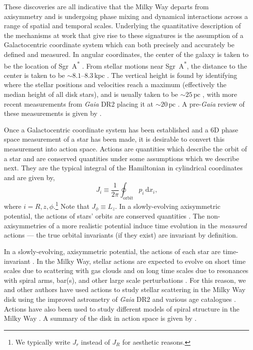 \documentclass[twocolumn]{aastex62}
\newcommand{\pc}{\text{pc}}
\newcommand{\kpc}{\text{kpc}}
\newcommand{\beq}{\begin{equation}}
\newcommand{\eeq}{\end{equation}}
\begin{document}
These discoveries are all indicative that the Milky Way departs from
axisymmetry and is undergoing phase mixing and dynamical interactions across a
range of spatial and temporal scales. Underlying the quantitative description
of the mechanisms at work that give rise to these signatures is the assumption
of a Galactocentric coordinate system \citep{2008gady.book.....B} which can
both precisely and accurately be defined and measured. In angular coordinates,
the center of the galaxy is taken to be the location of
Sgr~A\textsuperscript{*} \citep[e.g.][]{2004ApJ...616..872R}. From stellar
motions near Sgr~A\textsuperscript{*}, the distance to the center is taken to
be $\sim 8.1\text{--}8.3\,\kpc$
\citep{2009ApJ...692.1075G,2018AA...615L..15G}. The vertical height is found
by identifying where the stellar positions and velocities reach a maximum
(effectively the median height of all disk stars), and is usually taken to be
$\sim 25\,\pc$ \citep{2001ApJ...553..184C}, with more recent measurements from
{\em Gaia} DR2 placing it at $\sim 20\,\pc$ \citep{2019MNRAS.482.1417B}. A
pre-{\em Gaia} review of these measurements is given by
\citet{2016ARAA..54..529B}.

Once a Galactocentric coordinate system has been established and a 6D phase
space measurement of a star has been made, it is desirable to convert this
measurement into action space. Actions are quantities which describe the orbit
of a star and are conserved quantities under some assumptions which we
describe next. They are the typical integral of the Hamiltonian in cylindrical
coordinates and are given by,
\beq\label{eq:actions}
J_i \equiv
\frac{1}{2\pi} \oint_{\text{orbit}}p_i\,\text{d}x_i\text{,}
\eeq
where $i=R,z,\phi$.\footnote{We typically write $J_r$ instead of $J_R$ for
aesthetic reasons.} Note that $J_{\phi} \equiv L_z$. In a slowly-evolving
axisymmetric potential, the actions of stars' orbits are conserved quantities
\citep{2008gady.book.....B,2014RvMP...86....1S}. The non-axisymmetries of a
more realistic potential induce time evolution in the {\em measured} actions
--- the true orbital invariants (if they exist) are invariant by definition.

In a slowly-evolving, axisymmetric potential, the actions of each star are
time-invariant \citep{2008gady.book.....B}. In the Milky Way, stellar actions
are expected to evolve on short time scales due to scattering with gas clouds
and on long time scales due to resonances with spiral arms, bar(s), and other
large scale perturbations \citep{2014RvMP...86....1S}. For this reason, we and
other authors have used actions to study stellar scattering in the Milky Way
disk using the improved astrometry of {\em Gaia} DR2 and various age
catalogues \citep{2018ApJ...867...31B,2018arXiv180803278T}. Actions have also
been used to study different models of spiral structure in the Milky Way
\citep{2019MNRAS.tmp..155S}. A summary of the disk in action space is given by
\citet{2018arXiv180503653T}.
\end{document}
